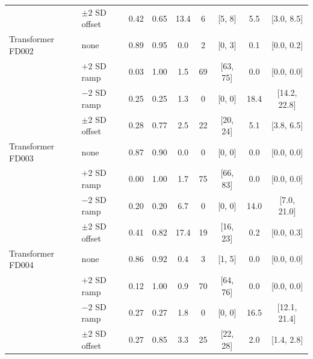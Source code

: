 \begin{tabular}{llccccccc}
 & $\pm2$ SD offset & 0.42 & 0.65 & 13.4 & 6 & [5, 8] & 5.5 & [3.0, 8.5] \\
\addlinespace[2pt]
Transformer FD002 & none & 0.89 & 0.95 & 0.0 & 2 & [0, 3] & 0.1 & [0.0, 0.2] \\
 & $+2$ SD ramp & 0.03 & 1.00 & 1.5 & 69 & [63, 75] & 0.0 & [0.0, 0.0] \\
 & $-2$ SD ramp & 0.25 & 0.25 & 1.3 & 0 & [0, 0] & 18.4 & [14.2, 22.8] \\
 & $\pm2$ SD offset & 0.28 & 0.77 & 2.5 & 22 & [20, 24] & 5.1 & [3.8, 6.5] \\
\addlinespace[2pt]
Transformer FD003 & none & 0.87 & 0.90 & 0.0 & 0 & [0, 0] & 0.0 & [0.0, 0.0] \\
 & $+2$ SD ramp & 0.00 & 1.00 & 1.7 & 75 & [66, 83] & 0.0 & [0.0, 0.0] \\
 & $-2$ SD ramp & 0.20 & 0.20 & 6.7 & 0 & [0, 0] & 14.0 & [7.0, 21.0] \\
 & $\pm2$ SD offset & 0.41 & 0.82 & 17.4 & 19 & [16, 23] & 0.2 & [0.0, 0.3] \\
\addlinespace[2pt]
Transformer FD004 & none & 0.86 & 0.92 & 0.4 & 3 & [1, 5] & 0.0 & [0.0, 0.0] \\
 & $+2$ SD ramp & 0.12 & 1.00 & 0.9 & 70 & [64, 76] & 0.0 & [0.0, 0.0] \\
 & $-2$ SD ramp & 0.27 & 0.27 & 1.8 & 0 & [0, 0] & 16.5 & [12.1, 21.4] \\
 & $\pm2$ SD offset & 0.27 & 0.85 & 3.3 & 25 & [22, 28] & 2.0 & [1.4, 2.8] \\
\bottomrule\end{tabular}
